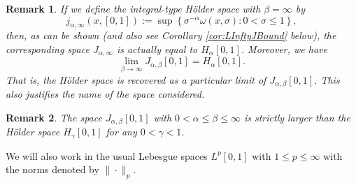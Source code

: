 \documentclass[12pt,a4paper]{article}
\newtheorem{rem}{Remark}
\begin{document}
\begin{rem}
	If we define the integral-type H\"older space with $\beta = \infty$ by
	\begin{equation}
		j_{\alpha,\infty}(x, [0,1]) := \sup\left\{\sigma^{-\alpha} \omega(x, \sigma): 0<\sigma\leq 1\right\},
	\end{equation}
	then, as can be shown \cite{appell1987application} (and also see Corollary \ref{cor:LInftyJBound} below), the corresponding space $J_{\alpha,\infty}$ is actually equal to $H_\alpha[0,1]$. Moreover, we have
	\begin{equation}
		\lim\limits_{\beta\rightarrow\infty} J_{\alpha,\beta}[0,1] = H_\alpha[0,1].
	\end{equation}
	That is, the H\"older space is recovered as a particular limit of $J_{\alpha,\beta}[0,1]$. This also justifies the name of the space considered.
\end{rem}

\begin{rem}
	The space $J_{\alpha,\beta}[0,1]$ with $0<\alpha\leq \beta\leq \infty$ is strictly larger than the H\"older space $H_\gamma[0,1]$ for any $0<\gamma<1$. 
\end{rem}

We will also work in the usual Lebesgue spaces $L^p[0,1]$ with $1\leq p \leq \infty$ with the norms denoted by $\|\cdot\|_p$. 
\end{document}
